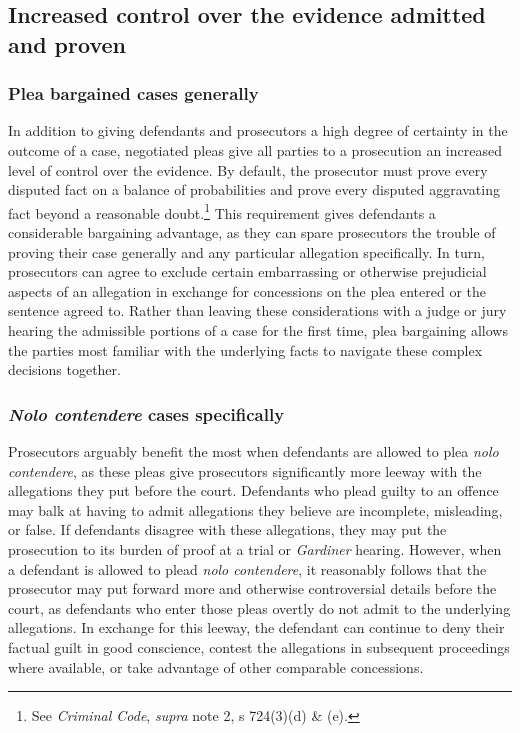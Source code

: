 \subsection{Increased control over the evidence admitted and proven}

\subsubsection{Plea bargained cases generally}

In addition to giving defendants and prosecutors a high degree of certainty in the outcome of a case, negotiated pleas give all parties to a prosecution an increased level of control over the evidence. By default, the prosecutor must prove every disputed fact on a balance of probabilities and prove every disputed aggravating fact beyond a reasonable doubt.\footnote{See \textit{Criminal Code}, \textit{supra} note 2, s 724(3)(d) \& (e).} This requirement gives defendants a considerable bargaining advantage, as they can spare prosecutors the trouble of proving their case generally and any particular allegation specifically. In turn, prosecutors can agree to exclude certain embarrassing or otherwise prejudicial aspects of an allegation in exchange for concessions on the plea entered or the sentence agreed to. Rather than leaving these considerations with a judge or jury hearing the admissible portions of a case for the first time, plea bargaining allows the parties most familiar with the underlying facts to navigate these complex decisions together.

\subsubsection{\textit{Nolo contendere} cases specifically}

Prosecutors arguably benefit the most when defendants are allowed to plea \textit{nolo contendere}, as these pleas give prosecutors significantly more leeway with the allegations they put before the court. Defendants who plead guilty to an offence may balk at having to admit allegations they believe are incomplete, misleading, or false. If defendants disagree with these allegations, they may put the prosecution to its burden of proof at a trial or \textit{Gardiner} hearing. However, when a defendant is allowed to plead \textit{nolo contendere}, it reasonably follows that the prosecutor may put forward more and otherwise controversial details before the court, as defendants who enter those pleas overtly do not admit to the underlying allegations. In exchange for this leeway, the defendant can continue to deny their factual guilt in good conscience, contest the allegations in subsequent proceedings where available, or take advantage of other comparable concessions.


